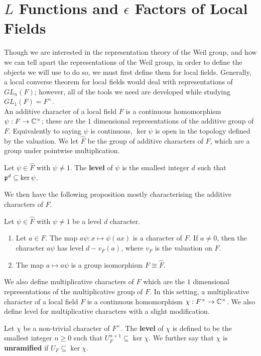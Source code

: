 \section{$L$ Functions and $\epsilon$ Factors of Local Fields}
\label{sec:Leps-LF}
Though we are interested in the representation theory of the Weil group, and how we can tell apart the representations of the Weil group, in order to define the objects we will use to do so, we must first define them for local fields.
Generally, a local converse theorem for local fields would deal with representations of $GL_n(F)$; however, all of the tools we need are developed while studying $GL_1(F) = F^\times$.\\

An additive character of a local field $F$ is a continuous homomorphism $\psi: F \to \mathbb{C}^\times$; these are the $1$ dimensional representations of the additive group of $F$.
Equivalently to saying $\psi$ is continuous, $\ker \psi$ is open in the topology defined by the valuation.
We let $\hat{F}$ be the group of additive characters of $F$, which are a group under pointwise multiplication.
\begin{defn}
  Let $\psi \in \hat{F}$ with $\psi \neq 1$.
  The \textbf{level} of $\psi$ is the smallest integer $d$ such that $\mathfrak{p}^d \subseteq \ker \psi$.
\end{defn}
We then have the following proposition mostly characterising the additive characters of $F$.
\begin{prop}
  Let $\psi \in \hat{F}$ with $\psi \neq 1$ be a level $d$ character.
  \begin{enumerate}
    \item Let $a \in F$. The map $a \psi : x \mapsto \psi(ax)$ is a character of $F$. If $a \neq 0$, then the character $a \psi$ has level $d - v_F(a)$, where $v_F$ is the valuation on $F$.
    \item The map $a \mapsto a \psi$ is a group isomorphism $F \cong \hat{F}$.
  \end{enumerate}
\end{prop}

We also define multiplicative characters of $F$ which are the $1$ dimensional representations of the multiplicative group of $F$.
In this setting, a multiplicative character of a local field $F$ is a continuous homomorphism $\chi : F^\times \to \mathbb{C}^\times$.
We also define level for multiplicative characters with a slight modification.
\begin{defn}
  Let $\chi$ be a non-trivial character of $F^\times$.
  The \textbf{level} of $\chi$ is defined to be the smallest integer $n \geq 0$ such that $U^{n+1}_F \subseteq \ker \chi$.
  We further say that $\chi$ is \textbf{unramified} if $U_F \subseteq \ker \chi$.
\end{defn}

